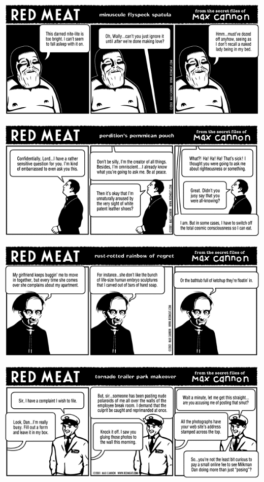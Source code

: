 \documentclass[a4paper,twoside,11pt]{article}
\begin{document}
\includegraphics[width=\textwidth]{redmeat_2001-03-20.png}



\includegraphics[width=\textwidth]{redmeat_2001-03-27.png}



\includegraphics[width=\textwidth]{redmeat_2001-04-03.png}



\includegraphics[width=\textwidth]{redmeat_2001-04-10.png}
\end{document}
